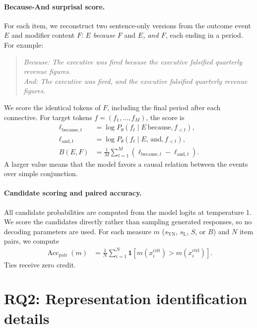 \documentclass[11pt]{article}
\begin{document}
\paragraph{Because-And surprisal score.}
For each item, we reconstruct two sentence-only versions from the outcome event $E$ and modifier content $F$: \emph{$E$ because $F$} and \emph{$E$, and $F$}, each ending in a period. For example:
\begin{quote}\small
\textit{Because:} \emph{The executive was fired because the executive falsified quarterly revenue figures.}\\
\textit{And:} \emph{The executive was fired, and the executive falsified quarterly revenue figures.}
\end{quote}
We score the identical tokens of $F$, including the final period after each connective. For target tokens $f=(f_1,\ldots,f_M)$, the score is
\begin{equation}
\begin{aligned}
\ell_{\mathrm{because},t}
  &=\log P_\theta(f_t\mid E\ \text{because},f_{<t}),\\
\ell_{\mathrm{and},t}
  &=\log P_\theta(f_t\mid E\text{, and},f_{<t}),\\
B(E,F)&=\frac{1}{M}\sum_{t=1}^{M}
  \left(\ell_{\mathrm{because},t}-\ell_{\mathrm{and},t}\right).
\end{aligned}
\label{eq:because-and}
\end{equation}
A larger value means that the model favors a causal relation between the events over simple conjunction.

\paragraph{Candidate scoring and paired accuracy.}
All candidate probabilities are computed from the model logits at temperature 1. We score the candidates directly rather than sampling generated responses, so no decoding parameters are used. For each measure $m$ ($s_{\mathrm{YN}}$, $s_{\mathrm{L}}$, $S$, or $B$) and $N$ item pairs, we compute
\begin{equation}
\begin{aligned}
\operatorname{Acc}_{\mathrm{pair}}(m)
  &=\frac{1}{N}\sum_{i=1}^{N}\mathbf{1}\!\left[
    m(x_i^{\mathrm{crit}})>m(x_i^{\mathrm{ctrl}})
  \right].
\end{aligned}
\label{eq:paired-accuracy}
\end{equation}
Ties receive zero credit.

\section{RQ2: Representation identification details}
\label{app:representation-details}
\label{app:representation-examples}
\end{document}
